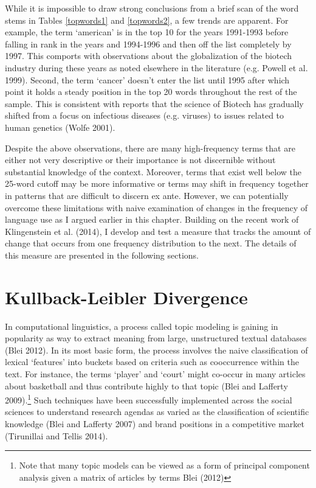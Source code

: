 While it is impossible to draw strong conclusions from a brief scan of the word stems in Tables \ref{topwords1} and \ref{topwords2}, a few trends are apparent. For example, the  term `american' is in the top 10 for the years 1991-1993 before falling in rank in the years and 1994-1996 and then off the list completely by 1997. This comports with observations about the globalization of the biotech industry during these years as noted elsewhere in the literature (e.g. Powell et al. 1999). Second, the term `cancer' doesn't enter the list until 1995 after which point it holds a steady position in the top 20 words throughout the rest of the sample. This is consistent with reports that the science of Biotech has gradually shifted from a focus on infectious diseases (e.g. viruses) to issues related to human genetics (Wolfe 2001).

Despite the above observations, there are many high-frequency terms that are either not very descriptive or their importance is not discernible without substantial knowledge of the context. Moreover, terms that exist well below the 25-word cutoff may be more informative or terms may shift in frequency together in patterns that are difficult to discern ex ante. However, we can potentially overcome these limitations with naive examination of changes in the frequency of language use as I argued earlier in this chapter. Building on the recent work of Klingenstein et al. (2014), I develop and test a measure that tracks the amount of change that occurs from one frequency distribution to the next. The details of this measure are presented in the following sections.

\section{Kullback-Leibler Divergence\label{kld}}

In computational linguistics, a process called topic modeling is gaining in popularity as way to extract meaning from large, unstructured textual databases (Blei 2012). In its most basic form, the process involves the naive classification of lexical `features' into buckets based on criteria such as cooccurrence within the text. For instance, the terms `player' and `court' might co-occur in many articles about basketball and thus contribute highly to that topic (Blei and Lafferty 2009).\footnote{Note that many topic models can be viewed as a form of principal component analysis given a matrix of articles by terms Blei (2012)} Such techniques have been successfully implemented across the social sciences to understand research agendas as varied as the classification of scientific knowledge (Blei and Lafferty 2007) and brand positions in a competitive market (Tirunillai and Tellis 2014).

